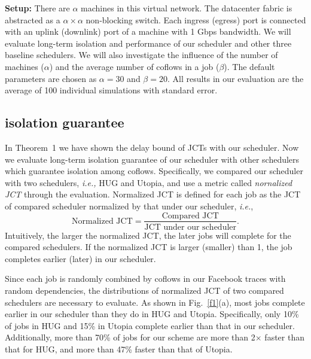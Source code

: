 \documentclass[10pt, conference, letterpaper]{IEEEtran}
\begin{document}
\noindent\textbf{Setup:} There are $\alpha$ machines in this virtual network. The datacenter fabric is abstracted as a $\alpha \times \alpha$ non-blocking switch. Each ingress (egress) port is connected with an uplink (downlink) port of a machine with 1 Gbps bandwidth. %
We will evaluate long-term isolation and performance of our scheduler and other three baseline schedulers. We will also investigate the influence of the number of machines ($\alpha$) and the average number of coflows in a job ($\beta$). The default parameters are chosen as $\alpha = 30$ and $\beta = 20$. All results in our evaluation are the average of 100 individual simulations with standard error.


\subsection{isolation guarantee}
In Theorem~1 we have shown the delay bound of JCTs with our scheduler. Now we evaluate long-term isolation guarantee of our scheduler with other schedulers which guarantee isolation among coflows. Specifically, we compared our scheduler with two schedulers, \emph{i.e.,} HUG and Utopia, and use a metric called \emph{nornalized JCT} through the evaluation. Normalized JCT is defined for each job as the JCT of compared scheduler normalized by that under our scheduler, \emph{i.e.},
\[\text{Normalized JCT} = \frac{\text{Compared JCT}}{\text{JCT under our scheduler}}.\]
Intuitively, the larger the normalized JCT, the later jobs will complete for the compared schedulers. If the normalized JCT is larger (smaller) than 1, the job completes earlier (later) in our scheduler.

Since each job is randomly combined by coflows in our Facebook traces with random dependencies, the distributions of normalized JCT of two compared schedulers are necessary to evaluate. As shown in Fig.~\ref{f1}(a), most jobs complete earlier in our scheduler than they do in HUG and Utopia. Specifically, only 10\% of jobs in HUG and 15\% in Utopia complete earlier than that in our scheduler. Additionally, more than 70\% of jobs for our scheme are more than 2$\times$ faster than that for HUG, and more than 47\% faster than that of Utopia.
\end{document}
